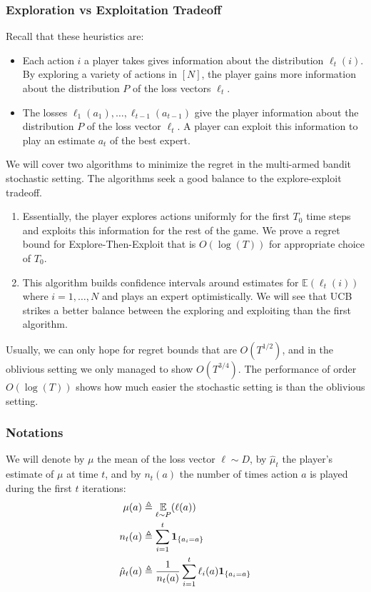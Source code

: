 \documentclass{article}
\begin{document}
\subsubsection{Exploration vs Exploitation Tradeoff}
Recall that these heuristics are:
\begin{itemize}
    \item {} Each action $i$ a player takes gives information about the distribution $\ell_{t}(i)$. By exploring a variety of actions in $[N]$, the player gains more information about the distribution $P$ of the loss vectors $\ell_{t}$.
    \item {} The losses $\ell_{1}\left(a_{1}\right), \ldots, \ell_{t-1}\left(a_{t-1}\right)$ give the player information about the distribution $P$ of the loss vector $\ell_{t} .$ A player can exploit this information to play an estimate $a_{t}$ of the best expert.
\end{itemize}
We will cover two algorithms to minimize the regret in the multi-armed bandit stochastic setting. The algorithms seek a good balance to the explore-exploit tradeoff. 
\begin{enumerate}
    \item {} Essentially, the player explores actions uniformly for the first $T_{0}$ time steps and exploits this information for the rest of the game. We prove a regret bound for Explore-Then-Exploit that is $O(\log (T))$ for appropriate choice of $T_{0}$.
    \item {} This algorithm builds confidence intervals around estimates for $\mathbb{E}\left(\ell_{t}(i)\right)$ where $i=1, \ldots, N$ and plays an expert optimistically. We will see that UCB strikes a better balance between the exploring and exploiting than the first algorithm.
\end{enumerate}
\begin{rema}
  Usually, we can only hope for regret bounds that are $O\left(T^{1 / 2}\right)$, and in the oblivious setting we only managed to show $O\left(T^{3 / 4}\right) .$ The performance of order $O(\log (T))$ shows how much easier the stochastic setting is than the oblivious setting.
\end{rema}
\subsubsection{Notations}
We will denote by $\mu$ the mean of the loss vector $\ell \sim D$, by $\hat{\mu}_{t}$ the player's estimate of $\mu$ at time $t$, and by $n_{t}(a)$ the number of times action $a$ is played during the first $t$ iterations:
\begin{align*}
\begin{aligned}
\mu(a) & \triangleq \underset{\ell \sim P}{\mathbb{E}}(\ell(a)) \\
n_{t}(a) & \triangleq \sum_{i=1}^{t} {\bf 1}_{\left\{a_{i}=a\right\}} \\
\hat{\mu}_{t}(a) & \triangleq \frac{1}{n_{t}(a)} \sum_{i=1}^{t} \ell_{i}(a) {\bf 1}_{\left\{a_{i}=a\right\}}
\end{aligned}
\end{align*}
\end{document}
